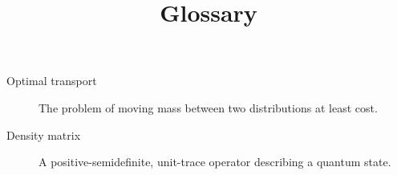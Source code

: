 \documentclass[11pt]{article}
\title{Glossary}
\date{}
\begin{document}
\maketitle
\begin{description}
\item[Optimal transport] The problem of moving mass between two distributions at least cost.
\item[Density matrix] A positive-semidefinite, unit-trace operator describing a quantum state.
\end{description}
\end{document}
